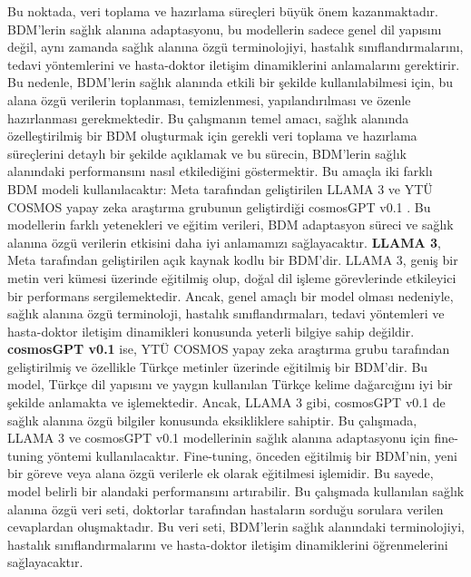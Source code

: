 \linebreak
Bu noktada, veri toplama ve hazırlama süreçleri büyük önem kazanmaktadır. BDM'lerin sağlık alanına adaptasyonu, bu modellerin sadece genel dil yapısını değil, aynı zamanda sağlık alanına özgü terminolojiyi, hastalık sınıflandırmalarını, tedavi yöntemlerini ve hasta-doktor iletişim dinamiklerini anlamalarını gerektirir. Bu nedenle, BDM'lerin sağlık alanında etkili bir şekilde kullanılabilmesi için, bu alana özgü verilerin toplanması, temizlenmesi, yapılandırılması ve özenle hazırlanması gerekmektedir.
\linebreak
Bu çalışmanın temel amacı, sağlık alanında özelleştirilmiş bir BDM oluşturmak için gerekli veri toplama ve hazırlama süreçlerini detaylı bir şekilde açıklamak ve bu sürecin, BDM'lerin sağlık alanındaki performansını nasıl etkilediğini göstermektir. Bu amaçla iki farklı BDM modeli kullanılacaktır: Meta tarafından geliştirilen LLAMA 3 ve YTÜ COSMOS yapay zeka araştırma grubunun geliştirdiği cosmosGPT v0.1 \cite{kesgin2024introducing}. Bu modellerin farklı yetenekleri ve eğitim verileri, BDM adaptasyon süreci ve sağlık alanına özgü verilerin etkisini daha iyi anlamamızı sağlayacaktır.
\linebreak
\textbf{LLAMA 3}, Meta tarafından geliştirilen açık kaynak kodlu bir BDM'dir. LLAMA 3, geniş bir metin veri kümesi üzerinde eğitilmiş olup, doğal dil işleme görevlerinde etkileyici bir performans sergilemektedir. Ancak, genel amaçlı bir model olması nedeniyle, sağlık alanına özgü terminoloji, hastalık sınıflandırmaları, tedavi yöntemleri ve hasta-doktor iletişim dinamikleri konusunda yeterli bilgiye sahip değildir.
\linebreak
\textbf{cosmosGPT v0.1} ise, YTÜ COSMOS yapay zeka araştırma grubu tarafından geliştirilmiş ve özellikle Türkçe metinler üzerinde eğitilmiş bir BDM'dir. Bu model, Türkçe dil yapısını ve yaygın kullanılan Türkçe kelime dağarcığını iyi bir şekilde anlamakta ve işlemektedir. Ancak, LLAMA 3 gibi, cosmosGPT v0.1 de sağlık alanına özgü bilgiler konusunda eksikliklere sahiptir.
\linebreak
Bu çalışmada, LLAMA 3 ve cosmosGPT v0.1 modellerinin sağlık alanına adaptasyonu için fine-tuning yöntemi kullanılacaktır. Fine-tuning, önceden eğitilmiş bir BDM'nin, yeni bir göreve veya alana özgü verilerle ek olarak eğitilmesi işlemidir. Bu sayede, model belirli bir alandaki performansını artırabilir. Bu çalışmada kullanılan sağlık alanına özgü veri seti, doktorlar tarafından hastaların sorduğu sorulara verilen cevaplardan oluşmaktadır. Bu veri seti, BDM'lerin sağlık alanındaki terminolojiyi, hastalık sınıflandırmalarını ve hasta-doktor iletişim dinamiklerini öğrenmelerini sağlayacaktır.
